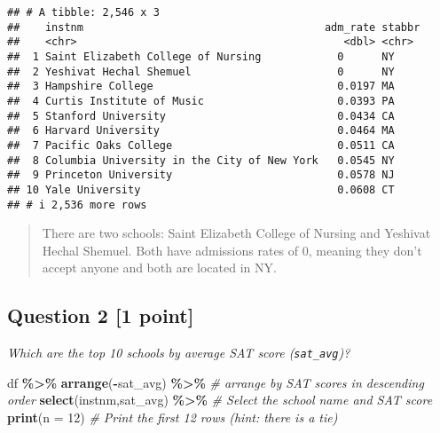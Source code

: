 \documentclass[
]{article}
\newenvironment{Shaded}{\begin{snugshade}}{\end{snugshade}}
\newcommand{\AttributeTok}[1]{\textcolor[rgb]{0.13,0.29,0.53}{#1}}
\newcommand{\CommentTok}[1]{\textcolor[rgb]{0.56,0.35,0.01}{\textit{#1}}}
\newcommand{\DecValTok}[1]{\textcolor[rgb]{0.00,0.00,0.81}{#1}}
\newcommand{\FunctionTok}[1]{\textcolor[rgb]{0.13,0.29,0.53}{\textbf{#1}}}
\newcommand{\NormalTok}[1]{#1}
\newcommand{\SpecialCharTok}[1]{\textcolor[rgb]{0.81,0.36,0.00}{\textbf{#1}}}
\begin{document}
\begin{verbatim}
## # A tibble: 2,546 x 3
##    instnm                                      adm_rate stabbr
##    <chr>                                          <dbl> <chr> 
##  1 Saint Elizabeth College of Nursing            0      NY    
##  2 Yeshivat Hechal Shemuel                       0      NY    
##  3 Hampshire College                             0.0197 MA    
##  4 Curtis Institute of Music                     0.0393 PA    
##  5 Stanford University                           0.0434 CA    
##  6 Harvard University                            0.0464 MA    
##  7 Pacific Oaks College                          0.0511 CA    
##  8 Columbia University in the City of New York   0.0545 NY    
##  9 Princeton University                          0.0578 NJ    
## 10 Yale University                               0.0608 CT    
## # i 2,536 more rows
\end{verbatim}

\begin{quote}
There are two schools: Saint Elizabeth College of Nursing and Yeshivat
Hechal Shemuel. Both have admissions rates of 0, meaning they don't
accept anyone and both are located in NY.
\end{quote}

\subsection{Question 2 {[}1 point{]}}\label{question-2-1-point}

\emph{Which are the top 10 schools by average SAT score
(\texttt{sat\_avg})?}

\begin{Shaded}
\begin{Highlighting}[]
\NormalTok{df }\SpecialCharTok{\%\textgreater{}\%}
  \FunctionTok{arrange}\NormalTok{(}\SpecialCharTok{{-}}\NormalTok{sat\_avg) }\SpecialCharTok{\%\textgreater{}\%} \CommentTok{\# arrange by SAT scores in descending order}
  \FunctionTok{select}\NormalTok{(instnm,sat\_avg) }\SpecialCharTok{\%\textgreater{}\%} \CommentTok{\# Select the school name and SAT score}
  \FunctionTok{print}\NormalTok{(}\AttributeTok{n =} \DecValTok{12}\NormalTok{) }\CommentTok{\# Print the first 12 rows (hint: there is a tie)}
\end{Highlighting}
\end{Shaded}
\end{document}
